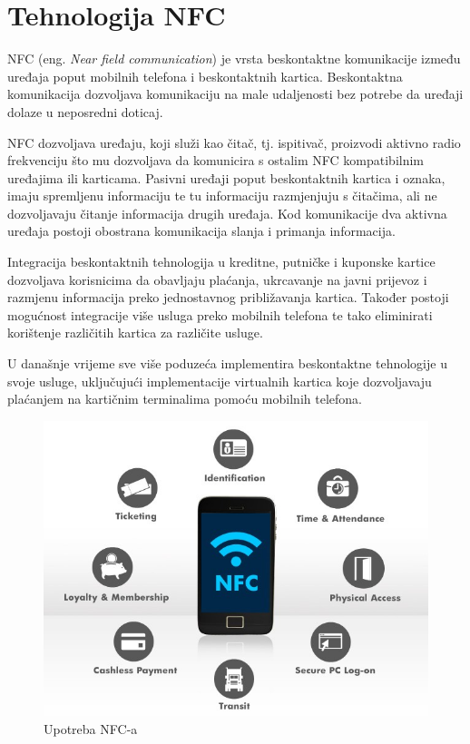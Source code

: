 \documentclass[times, utf8, zavrsni]{fer}
\begin{document}
\chapter{Tehnologija NFC}
NFC (eng. \textit{Near field communication}) je vrsta beskontaktne komunikacije između uređaja poput mobilnih telefona i beskontaktnih kartica. Beskontaktna komunikacija dozvoljava komunikaciju na male udaljenosti bez potrebe da uređaji dolaze u neposredni doticaj. \par
NFC dozvoljava uređaju, koji služi kao čitač, tj. ispitivač, proizvodi aktivno radio frekvenciju što mu dozvoljava da komunicira s ostalim NFC kompatibilnim uređajima ili karticama. Pasivni uređaji poput beskontaktnih kartica i oznaka, imaju spremljenu informaciju te tu informaciju razmjenjuju s čitačima, ali ne dozvoljavaju čitanje informacija drugih uređaja. Kod komunikacije dva aktivna uređaja postoji obostrana komunikacija slanja i primanja informacija.\par 
Integracija beskontaktnih tehnologija u kreditne, putničke i kuponske kartice dozvoljava korisnicima da obavljaju plaćanja, ukrcavanje na javni prijevoz i razmjenu informacija preko jednostavnog  približavanja kartica. Također postoji mogućnost integracije više usluga preko mobilnih telefona te tako eliminirati korištenje različitih kartica za različite usluge.\par 
U današnje vrijeme sve više poduzeća implementira beskontaktne tehnologije u svoje usluge, uključujući implementacije virtualnih kartica koje dozvoljavaju plaćanjem na kartičnim terminalima pomoću mobilnih telefona.
\citep{1}

\begin{figure}[h]
\includegraphics[scale=0.4]{nfcuse.jpeg}
\centering
\caption[]{Upotreba NFC-a \citep{2}}
\centering
\end{figure}
\end{document}
